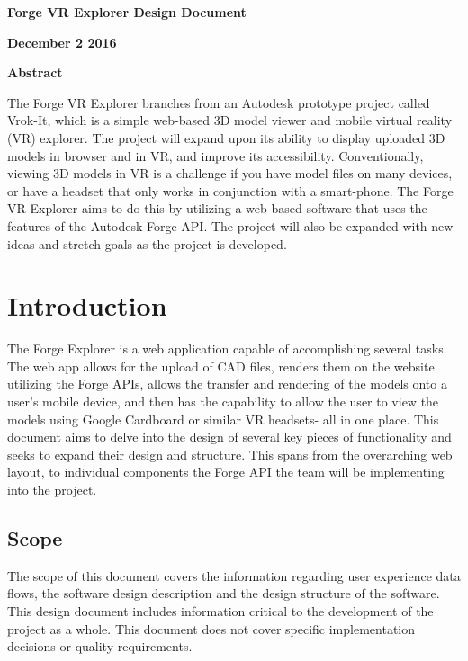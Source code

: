 \documentclass[letterpaper, 10pt, draftclsnofoot, compsoc, onecolumn]{IEEEtran}
\begin{document}
\bigskip

{\centering{}\bfseries\color{black}
Forge VR Explorer Design Document
\par}

\bigskip

{\centering{}\bfseries\color{black}
December 2 2016
\par}
\bigskip
\bigskip
\bigskip
\bigskip
\bigskip
\bigskip
\bigskip
\bigskip
\bigskip
\bigskip
\bigskip
\bigskip

\vfill
{\centering{}\bfseries\color{black}
Abstract
\par}

{\centering{}\mdseries\color{black}
	The Forge VR Explorer branches from an Autodesk prototype project called Vrok-It, which is a simple web-based 3D 
	model viewer and mobile virtual reality (VR) explorer. The project will expand upon its ability to display uploaded 3D 
	models in browser and in VR, and improve its accessibility. Conventionally, viewing 3D models in VR is a challenge if 
	you have model files on many devices, or have a headset that only works in conjunction with a smart-phone. The 
	Forge VR Explorer aims to do this by utilizing a web-based software that uses the features of the Autodesk Forge API. 
	The project will also be expanded with new ideas and stretch goals as the project is developed.
\par}
\clearpage

\section{Introduction}
The Forge Explorer is a web application capable of accomplishing several tasks. The web app allows for the upload of CAD files, renders them on the website utilizing the Forge APIs, allows the transfer and rendering of the models onto a user's mobile device, and then has the capability to allow the user to view the models using Google Cardboard or similar VR headsets- all in one place. This document aims to delve into the design of several key pieces of functionality and seeks to expand their design and structure. This spans from the overarching web layout, to individual components the Forge API the team will be implementing into the project.
\subsection{Scope}
The scope of this document covers the information regarding user experience data flows, the software design description and the design structure of the software. This design document includes information critical to the development of the project as a whole. This document does not cover specific implementation decisions or quality requirements.
\end{document}
